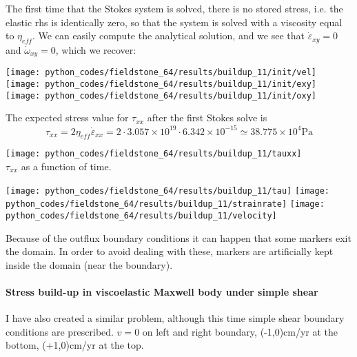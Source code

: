 The first time that the Stokes system is solved, there is no stored stress, i.e. the 
elastic rhs is identically zero, so that the system is solved with a viscosity equal to
$\eta_{eff}$.
We can easily compute the analytical solution, and we see that $\dot{\varepsilon}_{xy}=0$
and $\dot{\omega}_{xy}=0$, which we recover:

\begin{center}
\texttt{[image: python\_codes/fieldstone\_64/results/buildup\_11/init/vel]}
\texttt{[image: python\_codes/fieldstone\_64/results/buildup\_11/init/exy]}
\texttt{[image: python\_codes/fieldstone\_64/results/buildup\_11/init/oxy]}
\end{center}

The expected stress value for $\tau_{xx}$ after the first Stokes solve is 
\[
\tau_{xx} = 2 \eta_{eff} \dot{\varepsilon}_{xx} 
= 2 \cdot 3.057\times 10^{19} \cdot 6.342\times 10^{-15} 
\simeq 38.775 \times 10^4 \text{Pa}
\]

\begin{center}
\texttt{[image: python\_codes/fieldstone\_64/results/buildup\_11/tauxx]}\\
{\captionfont $\tau_{xx}$ as a function of time.}
\end{center}

\texttt{[image: python\_codes/fieldstone\_64/results/buildup\_11/tau]}
\texttt{[image: python\_codes/fieldstone\_64/results/buildup\_11/strainrate]}
\texttt{[image: python\_codes/fieldstone\_64/results/buildup\_11/velocity]}\\

\begin{remark}
Because of the outflux boundary conditions it can happen that some markers 
exit the domain. In order to avoid dealing with these, markers are artificially 
kept inside the domain (near the boundary).
\end{remark}

\paragraph{Stress build-up in viscoelastic Maxwell body under simple shear}

I have also created a similar problem, although this time simple shear boundary conditions are prescribed.
$v=0$ on left and right boundary, (-1,0)cm/yr at the bottom, (+1,0)cm/yr at the top.

